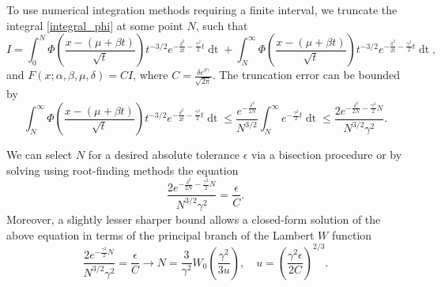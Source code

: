 \documentclass[10pt,a4paper,oneside]{article}
\numberwithin{equation}{section}
\begin{document}
To use numerical integration methods requiring a finite interval, we truncate the integral \eqref{integral_phi} at some point $N$, such that
\begin{equation*}
I = \int_0^N \Phi\left(\frac{x - (\mu +\beta t)}{\sqrt{t}}\right) t^{-3/2} e^{-\frac{\delta^2}{2t} - \frac{\gamma^2}{2}t} \mathop{dt} + \int_N^{\infty} \Phi\left(\frac{x - (\mu +\beta t)}{\sqrt{t}}\right) t^{-3/2} e^{-\frac{\delta^2}{2t} - \frac{\gamma^2}{2}t} \mathop{dt},
\end{equation*}
and $F(x; \alpha, \beta, \mu, \delta) = C I$, where $C = \frac{\delta e^{\delta \gamma}}{\sqrt{2\pi}}$. The truncation error can be bounded by
\begin{equation*}
\int_N^{\infty} \Phi\left(\frac{x - (\mu +\beta t)}{\sqrt{t}}\right) t^{-3/2} e^{-\frac{\delta^2}{2t} - \frac{\gamma^2}{2}t} \mathop{dt} \le \frac{e^{-\frac{\delta^2}{2N}}}{N^{3/2}}\int_N^{\infty} e^{- \frac{\gamma^2}{2}t} \mathop{dt} \le \frac{2 e^{-\frac{\delta^2}{2N} - \frac{\gamma^2}{2}N}}{N^{3/2} \gamma^2}.
\end{equation*}

We can select $N$ for a desired absolute tolerance $\epsilon$ via a bisection procedure or by solving using root-finding methods the equation
\begin{equation}
\frac{2 e^{-\frac{\delta^2}{2N} - \frac{\gamma^2}{2}N}}{N^{3/2} \gamma^2} = \frac{\epsilon}{C}.
\end{equation}
Moreover, a slightly lesser sharper bound allows a closed-form solution of the above equation in terms of the principal branch of the Lambert $W$ function \cite[\S 4.13]{NIST:DLMF}
\begin{equation}\label{N_equation}
\frac{2 e^{- \frac{\gamma^2}{2}N}}{N^{3/2} \gamma^2} = \frac{\epsilon}{C} \longrightarrow N = \frac{3}{\gamma^2}W_0\left(\frac{\gamma^2}{3u}\right), \quad u = \left(\frac{\gamma^2 \epsilon}{2 C}\right)^{2/3}.
\end{equation}
\end{document}
